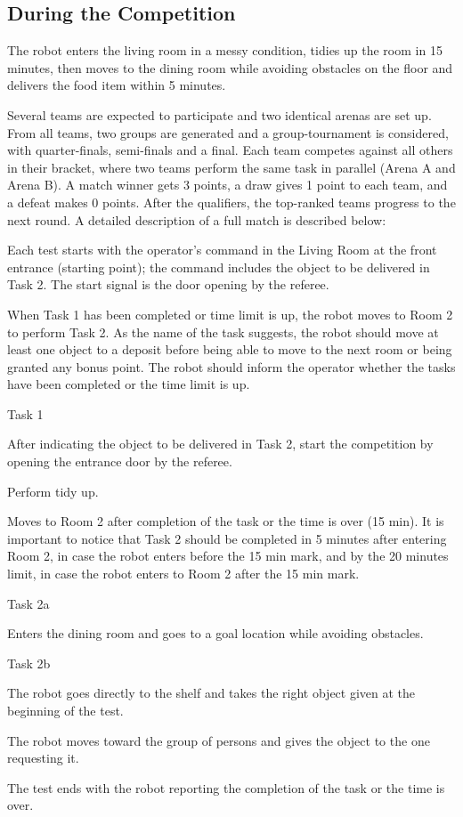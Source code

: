 \documentclass{article}
\newcommand{\SubItem}[1]{
    {\setlength\itemindent{15pt} \item[-] #1}
}
\begin{document}
\subsection{During the Competition}

The robot enters the living room in a messy condition, tidies up the room in 15 minutes, then moves to the dining room while avoiding obstacles on the floor and delivers the food item within 5 minutes.

Several teams are expected to participate and two identical arenas are set up. From all teams, two groups are generated and a group-tournament is considered, with quarter-finals, semi-finals and a final. Each team competes against all others in their bracket, where two teams perform the same task in parallel (Arena A and Arena B). A match winner gets 3 points, a draw gives 1 point to each team, and a defeat makes 0 points. After the qualifiers, the top-ranked teams progress to the next round. A detailed description of a full match is described below:

\begin{itemize}
    \item Each test starts with the operator's command in the Living Room at the front entrance (starting point); the command includes the object to be delivered in Task 2. The start signal is the door opening by the referee.
    \item When Task 1 has been completed or time limit is up, the robot moves to Room 2 to perform Task 2. As the name of the task suggests, the robot should move at least one object to a deposit before being able to move to the next room or being granted any bonus point. The robot should inform the operator whether the tasks have been completed or the time limit is up.
    \item Task 1
        \SubItem{After indicating the object to be delivered in Task 2, start the competition by opening the entrance door by the referee.}
        \SubItem{Perform tidy up.}
        \SubItem{Moves to Room 2 after completion of the task or the time is over (15 min). It is important to notice that Task 2 should be completed in 5 minutes after entering Room 2, in case the robot enters before the 15 min mark, and by the 20 minutes limit, in case the robot enters to Room 2 after the 15 min mark.}
    \item Task 2a
        \SubItem{Enters the dining room and goes to a goal location while avoiding obstacles.}
    \item Task 2b
        \SubItem{The robot goes directly to the shelf and takes the right object given at the beginning of the test.}
        \SubItem{The robot moves toward the group of persons and gives the object to the one requesting it.}
        \SubItem{The test ends with the robot reporting the completion of the task or the time is over.}
\end{itemize}
\end{document}
